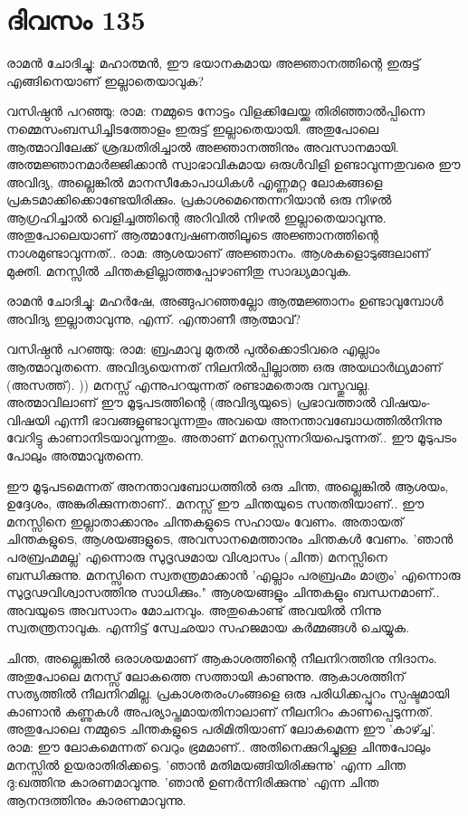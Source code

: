  
\section{ദിവസം 135}


രാമന്‍ ചോദിച്ചു: മഹാത്മന്‍, ഈ ഭയാനകമായ അജ്ഞാനത്തിന്റെ ഇരുട്ട്‌ എങ്ങിനെയാണ്‌ ഇല്ലാതെയാവുക?

വസിഷ്ഠന്‍ പറഞ്ഞു: രാമ: നമ്മുടെ നോട്ടം വിളക്കിലേയ്ക്കു തിരിഞ്ഞാല്‍പ്പിന്നെ നമ്മെസംബന്ധിച്ചിടത്തോളം ഇരുട്ട്‌ ഇല്ലാതെയായി. അതുപോലെ ആത്മാവിലേക്ക്‌ ശ്രദ്ധതിരിച്ചാല്‍ അജ്ഞാനത്തിനും അവസാനമായി. അത്മജ്ഞാനമാര്‍ജ്ജിക്കാന്‍ സ്വാഭാവികമായ ഒരുള്‍വിളി ഉണ്ടാവുന്നതുവരെ ഈ അവിദ്യ, അല്ലെങ്കില്‍ മാനസീകോപാധികള്‍ എണ്ണമറ്റ ലോകങ്ങളെ പ്രകടമാക്കിക്കൊണ്ടേയിരിക്കും. പ്രകാശമെന്തെന്നറിയാന്‍ ഒരു നിഴല്‍ ആഗ്രഹിച്ചാല്‍ വെളിച്ചത്തിന്റെ അറിവില്‍ നിഴല്‍ ഇല്ലാതെയാവുന്നു. അതുപോലെയാണ്‌ ആത്മാന്വേഷണത്തിലൂടെ അജ്ഞാനത്തിന്റെ നാശമുണ്ടാവുന്നത്‌.. രാമ: ആശയാണ്‌ അജ്ഞാനം. ആശകളൊടുങ്ങലാണ്‌ മുക്തി. മനസ്സില്‍ ചിന്തകളില്ലാത്തപ്പോഴാണിതു സാദ്ധ്യമാവുക.

രാമന്‍ ചോദിച്ചു: മഹര്‍ഷേ, അങ്ങുപറഞ്ഞല്ലോ ആത്മജ്ഞാനം ഉണ്ടാവുമ്പോള്‍ അവിദ്യ ഇല്ലാതാവുന്നു, എന്ന്. എന്താണീ ആത്മാവ്‌?

വസിഷ്ഠന്‍ പറഞ്ഞു: രാമ: ബ്രഹ്മാവു മുതല്‍ പുല്‍ക്കൊടിവരെ എല്ലാം ആത്മാവുതന്നെ. അവിദ്യയെന്നത്‌ നിലനില്‍പ്പില്ലാത്ത ഒരു അയഥാര്‍ഥ്യമാണ്‌ (അസത്ത്‌). ))  മനസ്സ്‌ എന്നുപറയുന്നത്‌ രണ്ടാമതൊരു വസ്തുവല്ല. അത്മാവിലാണ്‌ ഈ മൂടുപടത്തിന്റെ (അവിദ്യയുടെ) പ്രഭാവത്താല്‍ വിഷയം-വിഷയി എന്നീ ഭാവങ്ങളുണ്ടാവുന്നതും അവയെ അനന്താവബോധത്തില്‍നിന്നു വേറിട്ടു കാണാനിടയാവുന്നതും. അതാണ്‌ മനസ്സെന്നറിയപെടുന്നത്‌.. ഈ മൂടുപടം പോലും അത്മാവുതന്നെ.

ഈ മൂടുപടമെന്നത്‌ അനന്താവബോധത്തില്‍ ഒരു ചിന്ത, അല്ലെങ്കില്‍ ആശയം, ഉദ്ദേശം, അങ്കുരിക്കുന്നതാണ്‌.. മനസ്സ്‌ ഈ ചിന്തയുടെ സന്തതിയാണ്‌.. ഈ മനസ്സിനെ ഇല്ലാതാക്കാനും ചിന്തകളുടെ സഹായം വേണം. അതായത്‌ ചിന്തകളുടെ, ആശയങ്ങളുടെ, അവസാനമെത്താനും ചിന്തകള്‍ വേണം.  'ഞാന്‍ പരബ്രഹ്മമല്ല' എന്നൊരു സുദൃഢമായ വിശ്വാസം (ചിന്ത) മനസ്സിനെ ബന്ധിക്കുന്നു. മനസ്സിനെ സ്വതന്ത്രമാക്കാന്‍ 'എല്ലാം പരബ്രഹ്മം മാത്രം' എന്നൊരു സുദൃഢവിശ്വാസത്തിനു സാധിക്കും." ആശയങ്ങളും ചിന്തകളും ബന്ധനമാണ്‌.. അവയുടെ അവസാനം മോചനവും. അതുകൊണ്ട്‌ അവയില്‍ നിന്നു സ്വതന്ത്രനാവുക. എന്നിട്ട്‌ സ്വേഛയാ സഹജമായ കര്‍മ്മങ്ങള്‍ ചെയ്യുക.

ചിന്ത, അല്ലെങ്കില്‍ ഒരാശയമാണ്‌ ആകാശത്തിന്റെ നീലനിറത്തിനു നിദാനം. അതുപോലെ മനസ്സ്‌ ലോകത്തെ സത്തായി കാണുന്നു. ആകാശത്തിന്‌ സത്യത്തില്‍ നീലനിറമില്ല. പ്രകാശതരംഗംങ്ങളെ ഒരു പരിധിക്കപ്പുറം സ്പഷ്ടമായി കാണാന്‍ കണ്ണുകള്‍ അപര്യാപ്തമായതിനാലാണ്‌ നീലനിറം കാണപ്പെടുന്നത്‌. അതുപോലെ നമ്മുടെ ചിന്തകളുടെ പരിമിതിയാണ്‌ ലോകമെന്ന ഈ 'കാഴ്ച്ച'. രാമ: ഈ ലോകമെന്നത്‌ വെറും ഭ്രമമാണ്‌.. അതിനെക്കുറിച്ചുള്ള ചിന്തപോലും മനസ്സില്‍ ഉയരാതിരിക്കട്ടെ. 'ഞാന്‍ മതിമയങ്ങിയിരിക്കുന്നു' എന്ന ചിന്ത ദു:ഖത്തിനു കാരണമാവുന്നു. 'ഞാന്‍ ഉണര്‍ന്നിരിക്കുന്നു' എന്ന ചിന്ത ആനന്ദത്തിനും കാരണമാവുന്നു.

